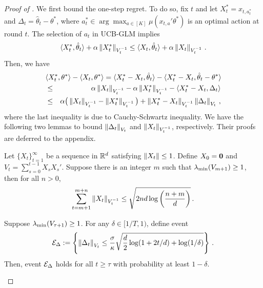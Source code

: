 \begin{proof}[Proof of ]
We first bound the one-step regret.  To do so, fix $t$ and let $X_t^* = x_{t, a_t^*}$ and $\Delta_t=\hat{\theta}_t-\theta^*$, where $a_t^* \in \arg\max_{a\in[K]}\mu(x_{t,a}'\theta^*)$ is an optimal action at round $t$.
The selection of $a_t$ in UCB-GLM implies
\begin{equation} \label{eq:pitstar}
\langle X_t^*, \hat{\theta}_t \rangle + \alpha \left\|X_t^*\right\|_{V_t^{-1}} \le \langle X_t, \hat{\theta}_t \rangle + \alpha \left\|X_t\right\|_{V_t^{-1}}\,.
\end{equation}
Then, we have
\begin{eqnarray*} 
\lefteqn{\iprod{X_t^*}{\theta^*} - \iprod{X_t}{\theta^*} = \iprod{X_t^* - X_t}{\hat{\theta}_t} - \iprod{X_t^* - X_t}{ \hat{\theta}_t - \theta^*}} \\
\label{eq:basic1}&\le&  \alpha \norm{X_t}_{V_t^{-1}} - \alpha \norm{X_t^*}_{V_t^{-1}}- \iprod{X_t^* - X_t}{ \Delta_t} \\
&\le&  \alpha \big ( \norm{X_t}_{V_t^{-1}} - \norm{X_t^*}_{V_t^{-1}} \big) + \norm{X_t^* - X_t}_{V_t^{-1}} \norm{\Delta_t}_{V_t}\,,
\end{eqnarray*}
where the last inequality is due to Cauchy-Schwartz inequality. We have the following two lemmas to bound $\left\|\Delta_t\right\|_{V_t}$ and $\left\|X_t\right\|_{V_t^{-1}}$, respectively.  Their proofs are deferred to the appendix.

\begin{lemma} \label{lm:widthsum}
Let $\{X_t\}_{t=1}^{\infty}$ be a sequence in $\mathbb{R}^d$ satisfying $\left\|X_t\right\| \le 1$.  Define $X_0=\mathbf{0}$ and $V_t=\sum_{s=0}^{t-1} X_s X_s'$. Suppose there is an integer $m$ such that $\lambda_{\min}(V_{m+1}) \ge 1$, then for all $n>0$,
$$ \sum_{t=m+1}^{m+n} \left\|X_t\right\|_{V_{t}^{-1}} \le \sqrt{2nd \log {\left(\frac{n+m}{d} \right)}}\,. $$
\end{lemma}

\begin{lemma} \label{lm:deltatbound}
Suppose $\lambda_{\min}(V_{\tau+1}) \ge 1$.  
For any $\delta \in [1/T,1)$, define event
\begin{equation*}
\mathcal{E}_\Delta := \left\{ \left\|\Delta_t\right\|_{V_t} \le \frac{\sigma}{\kappa} \sqrt{\frac{d}{2} \log(1+2t/d) + \log(1/\delta)} \right\}\,.
\end{equation*}
Then, event $\mathcal{E}_\Delta$ holds for all $t \ge \tau$ with probability at least $1-\delta$.
\end{lemma}


\end{proof}
